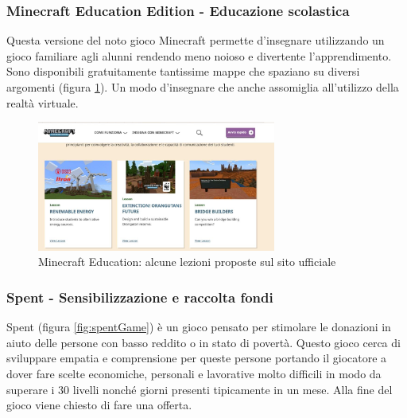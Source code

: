 \subsubsection{Minecraft Education Edition - Educazione scolastica}
Questa versione del noto gioco Minecraft \cite{minecraftEdu} permette d'insegnare utilizzando un gioco familiare agli alunni rendendo meno noioso e divertente l'apprendimento. Sono disponibili gratuitamente tantissime mappe che spaziano su diversi argomenti (figura \ref{fig:minecraftEdu}). Un modo d'insegnare che anche assomiglia all'utilizzo della realtà virtuale.

\begin{figure} [h!]
    \center
    \includegraphics[width=0.70\textwidth]{img/minecraft-lessons.jpg}
    \caption{Minecraft Education: alcune lezioni proposte sul sito ufficiale}
    \label{fig:minecraftEdu}
\end{figure}

\subsubsection{Spent - Sensibilizzazione e raccolta fondi}
Spent \cite{spentGame} (figura \ref{fig:spentGame}) è un gioco pensato per stimolare le donazioni in aiuto delle persone con basso reddito o in stato di povertà. Questo gioco cerca di  sviluppare empatia e comprensione per queste persone portando il giocatore a dover fare scelte economiche, personali e lavorative molto difficili in modo da superare i 30 livelli nonché giorni presenti tipicamente in un mese.
Alla fine del gioco viene chiesto di fare una offerta.

